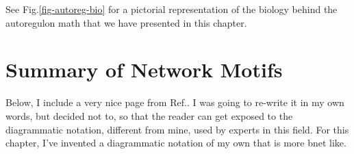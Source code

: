 See Fig.\ref{fig-autoreg-bio} for a 
pictorial representation
of the biology behind the autoregulon
math that we have presented in this chapter.

\section{Summary of Network Motifs}
Below, I include a very nice page from Ref.\cite{alon-book}.
I was going to re-write it in my own words, but
decided not to, so that the reader can get exposed to
the diagrammatic  notation, different from mine, used by experts in this field.
For this chapter, I've invented a diagrammatic
notation of my own that is more bnet like.
\newpage

